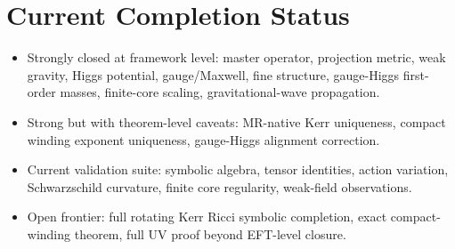 \documentclass[11pt]{article}
\begin{document}
\section{Current Completion Status}
\begin{itemize}[leftmargin=*]
\item Strongly closed at framework level: master operator, projection metric, weak gravity, Higgs potential, gauge/Maxwell, fine structure, gauge-Higgs first-order masses, finite-core scaling, gravitational-wave propagation.
\item Strong but with theorem-level caveats: MR-native Kerr uniqueness, compact winding exponent uniqueness, gauge-Higgs alignment correction.
\item Current validation suite: symbolic algebra, tensor identities, action variation, Schwarzschild curvature, finite core regularity, weak-field observations.
\item Open frontier: full rotating Kerr Ricci symbolic completion, exact compact-winding theorem, full UV proof beyond EFT-level closure.
\end{itemize}
\end{document}
